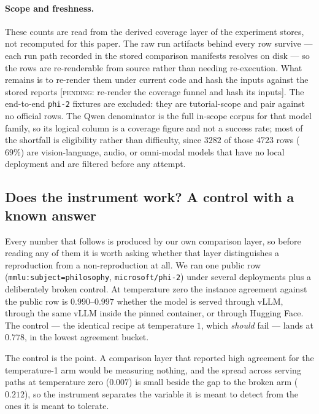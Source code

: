 \paragraph{Scope and freshness.} These counts are read from the derived coverage
layer of the experiment stores, not recomputed for this paper. The raw run
artifacts behind every row survive --- each run path recorded in the stored
comparison manifests resolves on disk --- so the rows are re-renderable from
source rather than needing re-execution. What remains is to re-render them under
current code and hash the inputs against the stored reports
{\color{orange}\textsf{\small[\textsc{pending}: re-render the coverage funnel and
hash its inputs]}}. The end-to-end
\texttt{phi-2} fixtures are excluded: they are tutorial-scope and pair against no
official rows. The Qwen denominator is the full in-scope corpus for that model
family, so its logical column is a coverage figure and not a success rate; most
of the shortfall is eligibility rather than difficulty, since $3282$ of those
$4723$ rows ($69\%$) are vision-language, audio, or omni-modal models that have no
local deployment and are filtered before any attempt.

\subsection{Does the instrument work? A control with a known answer}
\label{sec:phi2}

Every number that follows is produced by our own comparison layer, so before
reading any of them it is worth asking whether that layer distinguishes a
reproduction from a non-reproduction at all. We ran one public row
(\texttt{mmlu:subject=philosophy}, \texttt{microsoft/phi-2}) under several
deployments plus a deliberately broken control. At temperature zero the instance
agreement against the public row is $0.990$--$0.997$ whether the model is served
through vLLM, through the same vLLM inside the pinned container, or through
Hugging Face. The control --- the identical recipe at temperature $1$, which
\emph{should} fail --- lands at $0.778$, in the lowest agreement bucket.

The control is the point. A comparison layer that reported high agreement for the
temperature-1 arm would be measuring nothing, and the spread across serving paths
at temperature zero ($0.007$) is small beside the gap to the broken arm ($0.212$),
so the instrument separates the variable it is meant to detect from the ones it is
meant to tolerate.

